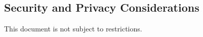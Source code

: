 
\subsection{Security and Privacy Considerations}
\label{loc:DocOverview_CUI}

\ifthenelse{\equal{\KNEADcuiStatus}{}}
{
	This document is not subject to \CUI restrictions.
}%
{%
	
}
